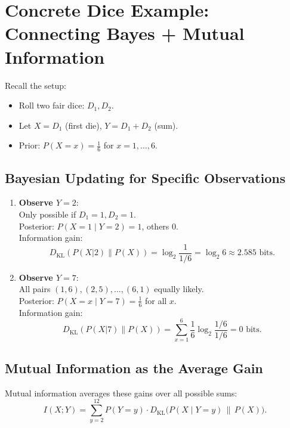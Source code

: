 \documentclass[11pt]{article}
\begin{document}
\section*{Concrete Dice Example: Connecting Bayes + Mutual Information}

Recall the setup:
\begin{itemize}
\item Roll two fair dice: \(D_1, D_2\).
    \item Let \(X = D_1\) (first die), \(Y = D_1 + D_2\) (sum).
    \item Prior: \(P(X = x) = \frac{1}{6}\) for \(x = 1,\dots,6\).
\end{itemize}

\subsection*{Bayesian Updating for Specific Observations}

\begin{enumerate}
    \item \textbf{Observe \(Y = 2\)}: \\
    Only possible if \(D_1 = 1, D_2 = 1\). \\
    Posterior: \(P(X = 1 \mid Y = 2) = 1\), others 0. \\
    Information gain:
    \[
    D_{\mathrm{KL}}(P(X|2) \| P(X)) = \log_2 \frac{1}{1/6} = \log_2 6 \approx 2.585 \text{ bits}.
    \]

    \item \textbf{Observe \(Y = 7\)}: \\
    All pairs \((1,6), (2,5), \dots, (6,1)\) equally likely. \\
    Posterior: \(P(X = x \mid Y = 7) = \frac{1}{6}\) for all \(x\). \\
    Information gain:
    \[
    D_{\mathrm{KL}}(P(X|7) \| P(X)) = \sum_{x=1}^6 \frac{1}{6} \log_2 \frac{1/6}{1/6} = 0 \text{ bits}.
    \]
\end{enumerate}

\subsection*{Mutual Information as the Average Gain}

Mutual information averages these gains over all possible sums:
\[
I(X;Y) = \sum_{y=2}^{12} P(Y = y) \cdot D_{\mathrm{KL}}\big(P(X \mid Y = y) \,\|\, P(X)\big).
\]
\end{document}
